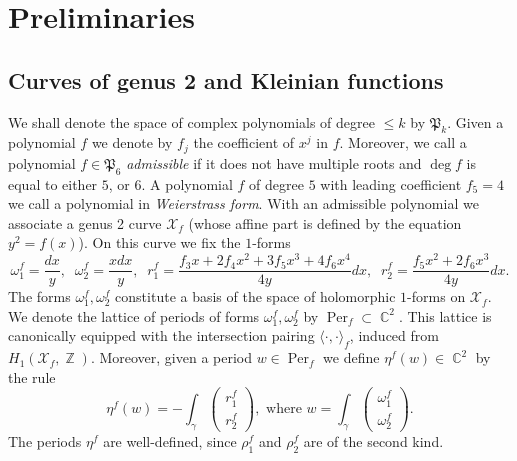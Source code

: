\documentclass{amsart}
\numberwithin{equation}{section}
\theoremstyle{definition}
\theoremstyle{remark}
\DeclareMathOperator{\CC}{\mathbb C}
\DeclareMathOperator{\ZZ}{\mathbb Z}
\DeclareMathOperator{\Per}{Per}
\begin{document}
	\section{Preliminaries}\label{sec:Prelim}
	
	\subsection{Curves of genus 2 and Kleinian functions}
	We shall denote the space of complex polynomials of degree $\le k$ by $\mathfrak P_k$. Given a polynomial $f$ we denote by $f_j$ the coefficient of $x^j$ in $f$. Moreover, we call a polynomial $f \in \mathfrak P_6$ {\it{admissible}} if it does not have multiple roots and $\deg f$ is equal to either $5$, or $6$. A polynomial $f$ of degree $5$ with leading coefficient $f_5 = 4$ we call a polynomial in {\it{Weierstrass form}}. With an admissible polynomial we associate a genus 2 curve $\mathcal X_f$ (whose affine part is defined by the equation $y^2 = f(x)$). On this curve we fix the $1$-forms
	\[
	\omega_1^f = \frac{dx}{y},\;\;\omega_2^f = \frac{xdx}{y},\;\;r_1^f = \frac{f_3x + 2f_4x^2 + 3f_5x^3 + 4f_6x^4}{4y}dx,\;\;r_2^f = \frac{f_5x^2 + 2f_6x^3}{4y}dx.
	\]
	The forms $\omega_1^f, \omega_2^f$ constitute a basis of the space of holomorphic $1$-forms on $\mathcal X_f$. We denote the lattice of periods of forms $\omega_1^f, \omega_2^f$ by $\Per_f \subset \CC^2$. This lattice is canonically equipped with the intersection pairing $\langle \cdot, \cdot\rangle_f$, induced from $H_1(\mathcal X_f, \ZZ)$. Moreover, given a period $w \in \Per_f$ we define $\eta^f(w) \in \CC^2$ by the rule
	\begin{equation*}
		\eta^f(w) = -\int_\gamma \begin{pmatrix} r_1^f \\ r_2^f\end{pmatrix},\text{ where } w = \int_\gamma \begin{pmatrix} \omega_1^f \\ \omega_2^f \end{pmatrix}.
	\end{equation*}
	The periods $\eta^f$ are well-defined, since $\rho_1^f$ and $\rho_2^f$ are of the second kind.
	
\end{document}
